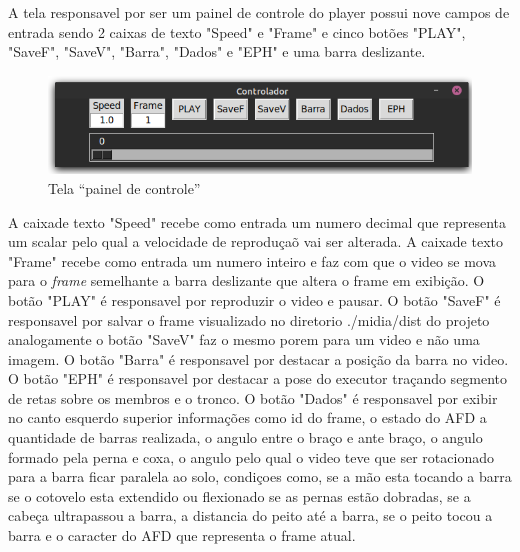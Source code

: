 A tela responsavel por ser um painel de controle do player possui nove campos de entrada sendo  2 caixas de texto  "Speed" e "Frame" e cinco botões "PLAY", "SaveF", "SaveV", "Barra", "Dados" e "EPH" e uma barra deslizante. 


\begin{figure}[!htb]
	\centering
	\includegraphics[scale=0.5]{figuras/view/painel_controller.png}
	\caption{Tela ``painel de controle''}
\end{figure}

A caixade texto "Speed" recebe como entrada um numero decimal que representa um scalar pelo qual a velocidade de reproduçaõ vai ser alterada. A caixade texto "Frame" recebe como entrada um numero inteiro e faz com que o video se mova para o \textit{frame} semelhante a barra deslizante que altera o frame em exibição. O botão "PLAY" é responsavel por reproduzir o video e pausar. O botão "SaveF" é responsavel por salvar o frame visualizado no diretorio ./midia/dist do projeto analogamente o botão "SaveV" faz o mesmo porem para um video e não uma imagem. O botão "Barra" é responsavel por  destacar a posição da barra no video. O botão "EPH" é responsavel por destacar a pose do executor traçando segmento de retas sobre os membros e o tronco. O botão "Dados" é responsavel por exibir no canto esquerdo superior informações como  
 id do frame, o estado do \ac{AFD} a quantidade de barras realizada, o angulo entre o braço e ante braço, o angulo formado pela perna e coxa, o angulo pelo qual o video teve que ser rotacionado para a barra ficar paralela ao solo, condiçoes como, se a mão esta tocando a barra se o cotovelo esta extendido ou flexionado se as pernas estão dobradas, se a cabeça ultrapassou a barra, a distancia do peito até a barra, se o peito tocou a barra e o caracter do \ac{AFD} que representa o frame atual.



